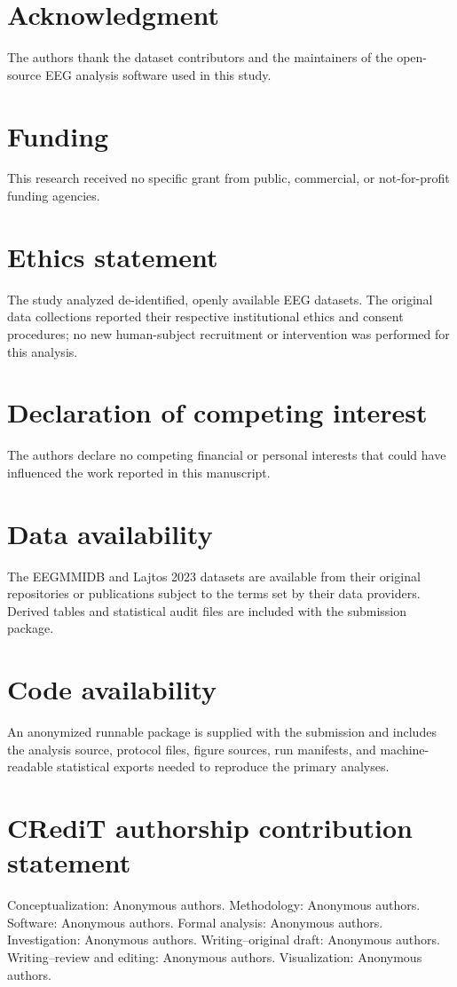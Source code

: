 \documentclass[preprint,12pt]{elsarticle}
\begin{document}
\section*{Acknowledgment}
The authors thank the dataset contributors and the maintainers of the open-source EEG analysis software used in this study.

\section*{Funding}
This research received no specific grant from public, commercial, or not-for-profit funding agencies.

\section*{Ethics statement}
The study analyzed de-identified, openly available EEG datasets. The original data collections reported their respective institutional ethics and consent procedures; no new human-subject recruitment or intervention was performed for this analysis.

\section*{Declaration of competing interest}
The authors declare no competing financial or personal interests that could have influenced the work reported in this manuscript.

\section*{Data availability}
The EEGMMIDB and Lajtos 2023 datasets are available from their original repositories or publications subject to the terms set by their data providers. Derived tables and statistical audit files are included with the submission package.

\section*{Code availability}
An anonymized runnable package is supplied with the submission and includes the analysis source, protocol files, figure sources, run manifests, and machine-readable statistical exports needed to reproduce the primary analyses.

\section*{CRediT authorship contribution statement}
Conceptualization: Anonymous authors. Methodology: Anonymous authors. Software: Anonymous authors. Formal analysis: Anonymous authors. Investigation: Anonymous authors. Writing--original draft: Anonymous authors. Writing--review and editing: Anonymous authors. Visualization: Anonymous authors.
\end{document}
